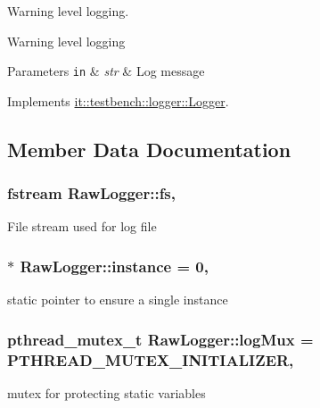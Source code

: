 Warning level logging. 

Warning level logging


\begin{DoxyParams}[1]{Parameters}
\mbox{\tt in}  & {\em str} & Log message \\
\hline
\end{DoxyParams}


Implements \hyperlink{classit_1_1testbench_1_1logger_1_1Logger_aa90a63a9ecbb042a37c1fdb86cd38f17}{it\-::testbench\-::logger\-::\-Logger}.



\subsection{Member Data Documentation}
\hypertarget{classit_1_1testbench_1_1logger_1_1RawLogger_a8018918b9883568201a3107306a290dd}{
\subsubsection[{fs}]{\setlength{\rightskip}{0pt plus 5cm}fstream Raw\-Logger\-::fs\hspace{0.3cm}{\ttfamily [static]}, {\ttfamily [private]}}}\label{d0/d37/classit_1_1testbench_1_1logger_1_1RawLogger_a8018918b9883568201a3107306a290dd}
File stream used for log file \hypertarget{classit_1_1testbench_1_1logger_1_1RawLogger_a5462a0dfa474c6b8ecf535188f92506c}{
\subsubsection[{instance}]{ $\ast$ Raw\-Logger\-::instance = 0\hspace{0.3cm}{\ttfamily [static]}, {\ttfamily [private]}}}\label{d0/d37/classit_1_1testbench_1_1logger_1_1RawLogger_a5462a0dfa474c6b8ecf535188f92506c}
static pointer to ensure a single instance \hypertarget{classit_1_1testbench_1_1logger_1_1RawLogger_acd2938fa7aeb52919e2620caa83a8880}{
\subsubsection[{log\-Mux}]{\setlength{\rightskip}{0pt plus 5cm}pthread\-\_\-mutex\-\_\-t Raw\-Logger\-::log\-Mux = P\-T\-H\-R\-E\-A\-D\-\_\-\-M\-U\-T\-E\-X\-\_\-\-I\-N\-I\-T\-I\-A\-L\-I\-Z\-E\-R\hspace{0.3cm}{\ttfamily [static]}, {\ttfamily [private]}}}\label{d0/d37/classit_1_1testbench_1_1logger_1_1RawLogger_acd2938fa7aeb52919e2620caa83a8880}
mutex for protecting static variables 

